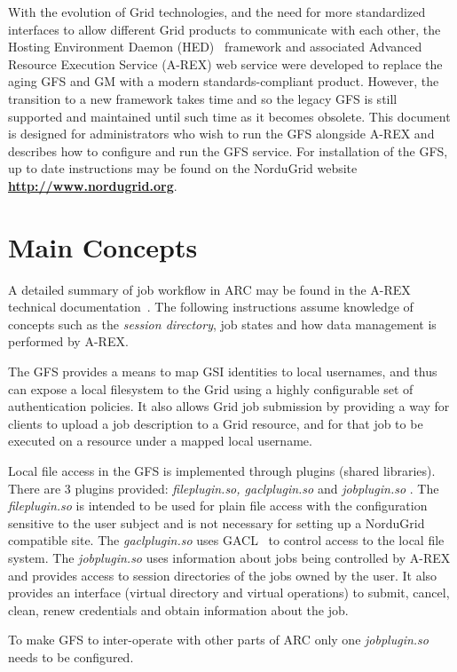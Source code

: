\documentclass{article}
\begin{document}
With the evolution of Grid technologies, and the need for more
standardized interfaces to allow different Grid products to
communicate with each other, the Hosting Environment Daemon
(HED)~\cite{HED} framework and associated Advanced Resource Execution
Service (A-REX) web service were developed to replace the aging GFS
and GM with a modern standards-compliant product. However, the
transition to a new framework takes time and so the legacy GFS is
still supported and maintained until such time as it becomes
obsolete. This document is designed for administrators who wish to run
the GFS alongside A-REX and describes how to configure and run the GFS
service. For installation of the GFS, up to date instructions may be
found on the NorduGrid website \textbf{\url{http://www.nordugrid.org}}.

\section{Main Concepts}

A detailed summary of job workflow in ARC may be found in the A-REX
technical documentation~\cite{arex}. The following instructions
assume knowledge of concepts such as the \emph{session directory},
job states and how data management is performed by A-REX.

The GFS provides a means to map GSI identities to local usernames, and
thus can expose a local filesystem to the Grid using a highly
configurable set of authentication policies. It also allows Grid job
submission by providing a way for clients to upload a job description
to a Grid resource, and for that job to be executed on a resource
under a mapped local username.

Local file access in the GFS is implemented through plugins (shared
libraries). There are 3 plugins provided: \textit{fileplugin.so,
  gaclplugin.so} and \textit{jobplugin.so} . The
\textit{fileplugin.so} is intended to be used for plain file access
with the configuration sensitive to the user subject and is not
necessary for setting up a NorduGrid compatible site. The
\textit{gaclplugin.so} uses GACL~\cite{gacl} to control access to the
local file system. The \textit{jobplugin.so} uses information about
jobs being controlled by A-REX and provides access to session
directories of the jobs owned by the user. It also provides an
interface (virtual directory and virtual operations) to submit,
cancel, clean, renew credentials and obtain information about the job.

To make GFS to inter-operate with other parts of ARC only one
\emph{jobplugin.so} needs to be configured.
\end{document}
